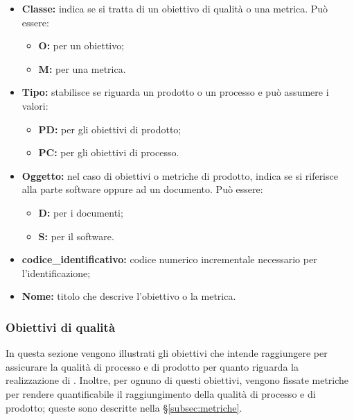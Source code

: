             \begin{itemize}
                \item \textbf{Classe:} indica se si tratta di un obiettivo di qualità o una metrica. Può essere:

                    \begin{itemize}
                        \item \textbf{O:} per un obiettivo;
                        \item \textbf{M:} per una metrica.
                    \end{itemize}

                \item \textbf{Tipo:} stabilisce se riguarda un prodotto o un processo e può assumere i valori:

                    \begin{itemize}
                        \item \textbf{PD:} per gli obiettivi di prodotto;
                        \item \textbf{PC:} per gli obiettivi di processo.
                    \end{itemize}

                \item \textbf{Oggetto:} nel caso di obiettivi o metriche di prodotto, indica se si riferisce alla parte
                software oppure ad un documento. Può essere:

                    \begin{itemize}
                        \item \textbf{D:} per i documenti;
                        \item \textbf{S:} per il software.
                    \end{itemize}

                \item \textbf{codice\_identificativo:} codice numerico incrementale necessario per l'identificazione;

                \item \textbf{Nome:} titolo che descrive l'obiettivo o la metrica.
            \end{itemize}
	
	\subsubsection{Obiettivi di qualità} \label{obiettivi_qualita}
		In questa sezione vengono illustrati gli obiettivi che \GroupName{} intende 
		raggiungere per assicurare la qualità di processo e di prodotto per quanto 
		riguarda la realizzazione di \ProjectName{}. Inoltre, per  ognuno di questi obiettivi, 
		vengono fissate metriche per rendere quantificabile il raggiungimento della qualità di 
		processo e di prodotto; queste sono descritte nella §\ref{subsec:metriche}.

